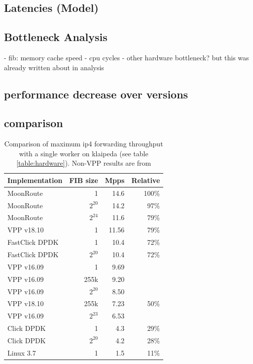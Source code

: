 


\subsection{Latencies (Model)}





\subsection{Bottleneck Analysis}

- fib: memory cache speed
- cpu cycles
- other hardware bottleneck? but this was already written about in analysis

\subsection{performance decrease over versions}

\subsection{comparison}


\begin{table}[!ht]
	\vspace{5ex}
	\begin{tabular}[]{ l r r r }
		Implementation & FIB size & Mpps & Relative \\ 
		\midrule
		MoonRoute & 1 & 14.6 & 100\% \\
		MoonRoute & $2^{20}$ & 14.2 & 97\% \\
		MoonRoute & $2^{24}$ & 11.6 & 79\% \\
		VPP v18.10 & 1 & 11.56 & 79\% \\
		FastClick DPDK & 1 & 10.4 & 72\% \\
		FastClick DPDK & $2^{20}$ & 10.4 & 72\% \\
		VPP v16.09 & 1 & 9.69 & \\
		VPP v16.09 & 255k & 9.20 & \\
		VPP v16.09 & $2^{20}$ & 8.50 & \\
		VPP v18.10 & 255k & 7.23 & 50\% \\
		VPP v16.09 & $2^{23}$ & 6.53 & \\
		Click DPDK & 1 & 4.3 & 29\% \\
		Click DPDK & $2^{20}$ & 4.2 & 28\% \\
		Linux 3.7 & 1 & 1.5 & 11\% \\

		\midrule
	\end{tabular}
	\caption{Comparison of maximum \Ac{ip4} forwarding throughput with a single worker on klaipeda (see table \ref{table:hardware}). Non-VPP results are from \cite{chair:architecture}}
	\label{table:comparison}
\end{table}